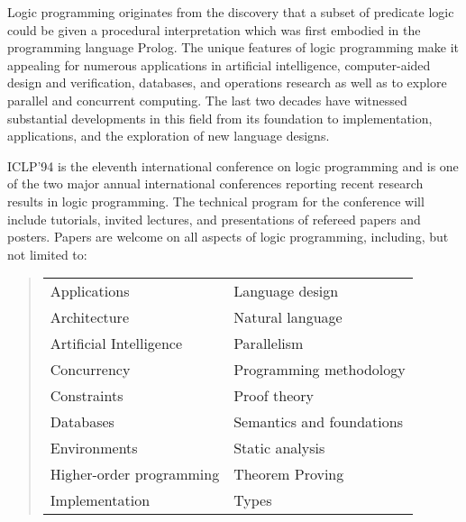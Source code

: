 \parbox{4.8in}{
\setlength{\parindent}{0.5cm}

Logic programming originates from the discovery that a subset of
predicate logic could be given a procedural interpretation which was
first embodied in the programming language Prolog. The unique features
of logic programming make it appealing for numerous applications in
artificial intelligence, computer-aided design and verification,
databases, and operations research as well as to explore parallel and
concurrent computing. The last two decades have witnessed substantial
developments in this field from its foundation to implementation,
applications, and the exploration of new language designs.

ICLP'94 is the eleventh international conference on logic programming
and is one of the two major annual international conferences reporting
recent research results in logic programming. The technical program
for the conference will include tutorials, invited lectures, and
presentations of refereed papers and posters. Papers are welcome on
all aspects of logic programming, including, but not limited to:

\begin{quote}
\begin{tabular}{ll}
Applications			& Language design      \\   
Architecture			& Natural language     \\   
Artificial Intelligence 	& Parallelism  \\
Concurrency     		& Programming methodology \\
Constraints			& Proof theory            \\
Databases			& Semantics and foundations \\
Environments			& Static analysis	\\
Higher-order programming	& Theorem Proving       \\
Implementation         		& Types                 \\
\end{tabular}
\end{quote}

}
